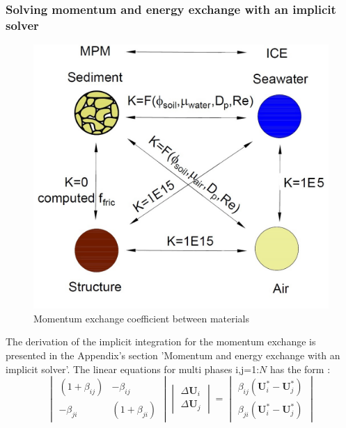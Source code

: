 \documentclass[preprint,12pt]{elsarticle}
\providecommand{\DIFadd}[1]{{\protect\color{blue}\uwave{#1}}} %
\providecommand{\DIFaddbegin}{} %
\providecommand{\DIFaddend}{} %
\newcommand{\DIFaddincludegraphics}[2][]{{\color{blue}\fbox{\DIFOincludegraphics[#1]{#2}}}} %
\DeclareRobustCommand{\DIFaddbegin}{\DIFOaddbegin \let\includegraphics\DIFaddincludegraphics} %
\DeclareRobustCommand{\DIFaddend}{\DIFOaddend \let\includegraphics\DIFOincludegraphics} %
\begin{document}
\subsubsection{Solving momentum and energy exchange with an implicit solver}
%
%
\begin{figure}[h]
\center
\includegraphics[scale=1.0]{K.jpg}
\caption{Momentum exchange coefficient between materials}
\label{fig:K}
\end {figure}
%
%
The derivation of the implicit integration for the momentum exchange is presented in the Appendix's section 'Momentum and energy exchange with an implicit solver'. The linear equations for multi phases i,j=1:$N$
has the form \DIFaddbegin \DIFadd{as}\DIFaddend :
%
\[ \begin{vmatrix} (1 + \beta_{ij})  &  -\beta_{ij} \\
                  -\beta_{ji}       &  (1 + \beta_{ji})
    \end {vmatrix}
    \begin{vmatrix} \Delta \pmb{U}_{i} \\
                    \Delta \pmb{U}_{j}
    \end {vmatrix}
    =
    \begin{vmatrix}  \beta_{ij}(\pmb{U}_{i}^{*} - \pmb{U}_{j}^{*}) \\
                    \beta_{ji}(\pmb{U}_{i}^{*} - \pmb{U}_{j}^{*})
    \end {vmatrix}                
\]
\end{document}
